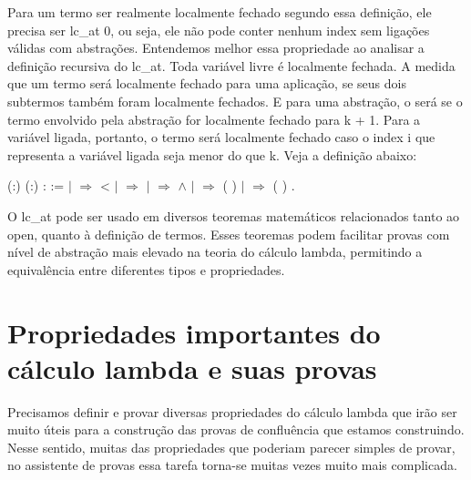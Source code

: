  Para um termo ser realmente localmente fechado segundo essa definição, ele precisa ser lc\_at 0, 
ou seja, ele não pode conter nenhum index sem ligações válidas com abstrações. Entendemos melhor essa
propriedade ao analisar a definição recursiva do lc\_at. Toda variável livre é localmente fechada. A medida
que um termo será localmente fechado para uma aplicação, se seus dois subtermos também foram localmente fechados.
E para uma abstração, o será se o termo envolvido pela abstração for localmente fechado para k + 1.
Para a variável ligada, portanto, o termo será localmente fechado caso o index i que representa a variável
ligada seja menor do que k. Veja a definição abaixo: \begin{coqdoccode}
\coqdocemptyline
\coqdocnoindent
{}  (:) (:) :  :=\coqdoceol
\coqdocindent{1.00em}
  \coqdoceol
\coqdocindent{1.00em}
\ensuremath{|}      \ensuremath{\Rightarrow}  < \coqdoceol
\coqdocindent{1.00em}
\ensuremath{|}      \ensuremath{\Rightarrow} \coqdoceol
\coqdocindent{1.00em}
\ensuremath{|}    \ensuremath{\Rightarrow}    \ensuremath{\land}   \coqdoceol
\coqdocindent{1.00em}
\ensuremath{|}      \ensuremath{\Rightarrow}  ( ) \coqdoceol
\coqdocindent{1.00em}
\ensuremath{|}      \ensuremath{\Rightarrow}  ( ) \coqdoceol
\coqdocindent{1.00em}
.\coqdoceol
\coqdocemptyline
\end{coqdoccode}
O lc\_at pode ser usado em diversos teoremas matemáticos relacionados tanto ao open, quanto
à definição de termos. Esses teoremas podem facilitar provas com nível de abstração mais elevado
na teoria do cálculo lambda, permitindo a equivalência entre diferentes tipos e propriedades.

\section{Propriedades importantes do cálculo lambda e suas provas}

\begin{coqdoccode}
\coqdocemptyline
\coqdocemptyline
\end{coqdoccode}
Precisamos definir e provar diversas propriedades do cálculo lambda que irão ser muito úteis
para a construção das provas de confluência que estamos construindo. Nesse sentido, muitas das propriedades
que poderiam parecer simples de provar, no assistente de provas essa tarefa torna-se muitas vezes muito
mais complicada. 

